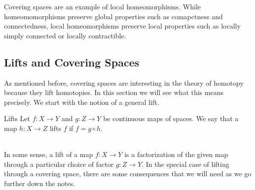 \documentclass[a4paper]{article}
\begin{document}
Covering spaces are an example of local homeomorphisms. While homeomomorphisms preserve global properties such as comapctness and connectedness, local homeomorphisms preserve local properties such as locally simply connected or locally contractible. 

\subsection{Lifts and Covering Spaces}
As mentioned before, covering spaces are interesting in the theory of homotopy because they lift homotopies. In this section we will see what this means precisely. We start with the notion of a general lift. 

\begin{defn}{Lifts}{} Let $f:X\to Y$ and $g:Z\to Y$ be continuous maps of spaces. We say that a map $h:X\to Z$ lifts $f$ if $f=g\circ h$. \\~\\
\end{defn}

In some sense, a lift of a map $f:X\to Y$ is a factorization of the given map through a particular choice of factor $g:Z\to Y$. In the special case of lifting through a covering space, there are some consequences that we will need as we go further down the notes. 
\end{document}
